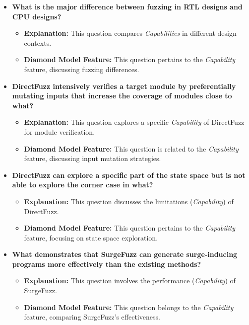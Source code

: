 \documentclass{article}
\begin{document}
\begin{itemize}
    \item \textbf{What is the major difference between fuzzing in RTL designs and CPU designs?}
    \begin{itemize}
        \item \textbf{Explanation:} This question compares \textit{Capabilities} in different design contexts.
        \item \textbf{Diamond Model Feature:} This question pertains to the \textit{Capability} feature, discussing fuzzing differences.
    \end{itemize}

    \item \textbf{DirectFuzz intensively verifies a target module by preferentially mutating inputs that increase the coverage of modules close to what?}
    \begin{itemize}
        \item \textbf{Explanation:} This question explores a specific \textit{Capability} of DirectFuzz for module verification.
        \item \textbf{Diamond Model Feature:} This question is related to the \textit{Capability} feature, discussing input mutation strategies.
    \end{itemize}

    \item \textbf{DirectFuzz can explore a specific part of the state space but is not able to explore the corner case in what?}
    \begin{itemize}
        \item \textbf{Explanation:} This question discusses the limitations (\textit{Capability}) of DirectFuzz.
        \item \textbf{Diamond Model Feature:} This question pertains to the \textit{Capability} feature, focusing on state space exploration.
    \end{itemize}

    \item \textbf{What demonstrates that SurgeFuzz can generate surge-inducing programs more effectively than the existing methods?}
    \begin{itemize}
        \item \textbf{Explanation:} This question involves the performance (\textit{Capability}) of SurgeFuzz.
        \item \textbf{Diamond Model Feature:} This question belongs to the \textit{Capability} feature, comparing SurgeFuzz's effectiveness.
    \end{itemize}


\end{itemize}
\end{document}
